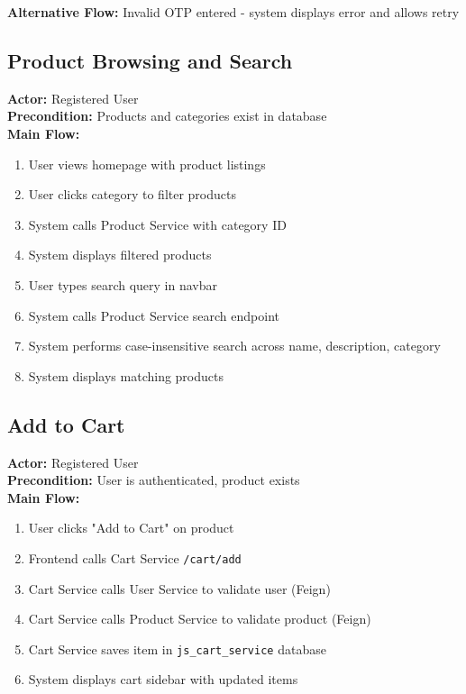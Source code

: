 \textbf{Alternative Flow:} Invalid OTP entered - system displays error and allows retry

\subsection{Product Browsing and Search}

\textbf{Actor:} Registered User\\
\textbf{Precondition:} Products and categories exist in database\\
\textbf{Main Flow:}
\begin{enumerate}
    \item User views homepage with product listings
    \item User clicks category to filter products
    \item System calls Product Service with category ID
    \item System displays filtered products
    \item User types search query in navbar
    \item System calls Product Service search endpoint
    \item System performs case-insensitive search across name, description, category
    \item System displays matching products
\end{enumerate}

\subsection{Add to Cart}

\textbf{Actor:} Registered User\\
\textbf{Precondition:} User is authenticated, product exists\\
\textbf{Main Flow:}
\begin{enumerate}
    \item User clicks "Add to Cart" on product
    \item Frontend calls Cart Service \texttt{/cart/add}
    \item Cart Service calls User Service to validate user (Feign)
    \item Cart Service calls Product Service to validate product (Feign)
    \item Cart Service saves item in \texttt{js\_cart\_service} database
    \item System displays cart sidebar with updated items
\end{enumerate}

